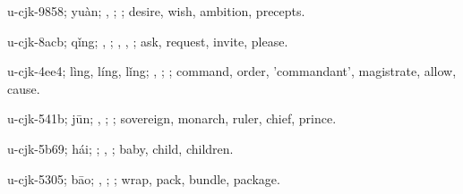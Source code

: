 \begin{multicols}{2}
{\cjkgGlue{}u-cjk-9858; yuàn; \cjkgGlue{}\cjkgGlue{}\cjkgGlue{}, \cjkgGlue{}; \cjkgGlue{}; desire, wish, ambition, precepts.

\cjkgGlue{}u-cjk-8acb; qǐng; \cjkgGlue{}\cjkgGlue{}\cjkgGlue{}, \cjkgGlue{}\cjkgGlue{}\cjkgGlue{}; \cjkgGlue{}, \cjkgGlue{}, \cjkgGlue{}; ask, request, invite, please.

\cjkgGlue{}u-cjk-4ee4; lìng, líng, lǐng; \cjkgGlue{}, \cjkgGlue{}; \cjkgGlue{}; command, order, 'commandant', magistrate, allow, cause.

\cjkgGlue{}u-cjk-541b; jūn; \cjkgGlue{}, \cjkgGlue{}; \cjkgGlue{}; sovereign, monarch, ruler, chief, prince.

\cjkgGlue{}u-cjk-5b69; hái; \cjkgGlue{}; \cjkgGlue{}, \cjkgGlue{}; baby, child, children.

\cjkgGlue{}u-cjk-5305; bāo; \cjkgGlue{}\cjkgGlue{}\cjkgGlue{}, \cjkgGlue{}\cjkgGlue{}\cjkgGlue{}; \cjkgGlue{}; wrap, pack, bundle, package.

}
\end{multicols}
